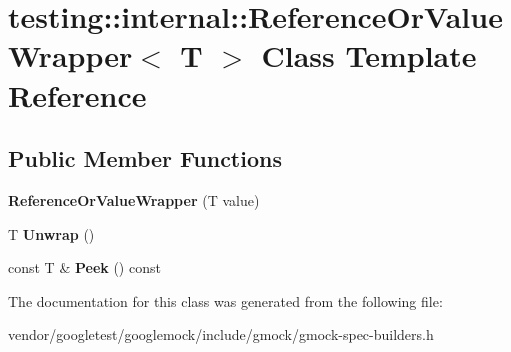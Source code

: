 \hypertarget{classtesting_1_1internal_1_1ReferenceOrValueWrapper}{}\section{testing\+:\+:internal\+:\+:Reference\+Or\+Value\+Wrapper$<$ T $>$ Class Template Reference}
\label{classtesting_1_1internal_1_1ReferenceOrValueWrapper}
\subsection*{Public Member Functions}
\begin{DoxyCompactItemize}
\item 
{\bfseries Reference\+Or\+Value\+Wrapper} (T value)\hypertarget{classtesting_1_1internal_1_1ReferenceOrValueWrapper_ae5544acd43aa0feed92aa51b4186ede9}{}\label{classtesting_1_1internal_1_1ReferenceOrValueWrapper_ae5544acd43aa0feed92aa51b4186ede9}

\item 
T {\bfseries Unwrap} ()\hypertarget{classtesting_1_1internal_1_1ReferenceOrValueWrapper_a5a6505b809ba770725e7b8091927a5ba}{}\label{classtesting_1_1internal_1_1ReferenceOrValueWrapper_a5a6505b809ba770725e7b8091927a5ba}

\item 
const T \& {\bfseries Peek} () const \hypertarget{classtesting_1_1internal_1_1ReferenceOrValueWrapper_a495d038e3d92ff12ac9d8d30ef9c590c}{}\label{classtesting_1_1internal_1_1ReferenceOrValueWrapper_a495d038e3d92ff12ac9d8d30ef9c590c}

\end{DoxyCompactItemize}


The documentation for this class was generated from the following file\+:\begin{DoxyCompactItemize}
\item 
vendor/googletest/googlemock/include/gmock/gmock-\/spec-\/builders.\+h\end{DoxyCompactItemize}
